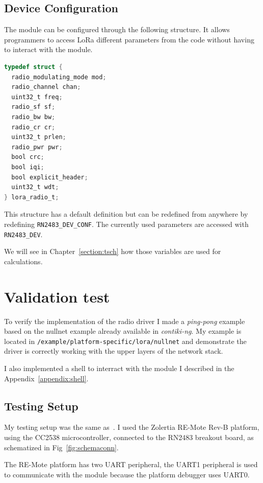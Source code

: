 

\subsection{Device Configuration}

The module can be configured through the following structure.
It allows programmers to access LoRa different parameters from the code without
having to interact with the module.

\begin{lstlisting}[language=C]
typedef struct {
  radio_modulating_mode mod;
  radio_channel chan;
  uint32_t freq;
  radio_sf sf;
  radio_bw bw;
  radio_cr cr;
  uint32_t prlen;
  radio_pwr pwr;
  bool crc;
  bool iqi;
  bool explicit_header;
  uint32_t wdt;
} lora_radio_t;
\end{lstlisting}

This structure has a default definition but can be redefined from anywhere
by redefining \lstinline{RN2483_DEV_CONF}.
The currently used parameters are accessed with \lstinline{RN2483_DEV}.

We will see in Chapter~\ref{section:tsch} how those variables are used for
calculations.

\section{Validation test}

To verify the implementation of the radio driver I made
a \emph{ping-pong} example based on the nullnet example already
available in \emph{contiki-ng}.
My example is located in \lstinline{/example/platform-specific/lora/nullnet}
and demonstrate the driver is correctly working with the upper layers of the
network stack.

I also implemented a shell to interract with the module I described
in the Appendix~\ref{appendix:shell}.

\subsection{Testing Setup}

My testing setup was the same as~\cite{8847137}. I used the Zolertia RE-Mote
Rev-B platform, using the CC2538 microcontroller, connected to the
RN2483 breakout board, as schematized in Fig~\ref{fig:schemaconn}.

The RE-Mote platform has two UART peripheral, the UART1 peripheral is used
to communicate with the module because the platform debugger uses UART0.

